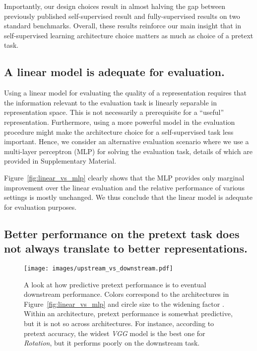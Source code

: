 \documentclass[10pt,twocolumn,letterpaper]{article}
\begin{document}
Importantly, our design choices result in almost halving the gap between previously published self-supervised result and fully-supervised results on two standard benchmarks.
Overall, these results reinforce our main insight that in self-supervised learning architecture choice matters as much as choice of a pretext task.
\subsection{A linear model is adequate for evaluation.}
\label{subsec:nonlinear}

Using a linear model for evaluating the quality of a representation requires that the information relevant to the evaluation task is linearly separable in representation space.
This is not necessarily a prerequisite for a ``useful'' representation.
Furthermore, using a more powerful model in the evaluation procedure might make the architecture choice for a self-supervised task less important.
Hence, we consider an alternative evaluation scenario where we use a multi-layer perceptron (MLP) for solving the evaluation task, details of which are provided in Supplementary Material.


Figure~\ref{fig:linear_vs_mlp} clearly shows that the MLP provides only marginal improvement over the linear evaluation and the relative performance of various settings is mostly unchanged.
We thus conclude that the linear model is adequate for evaluation purposes.

\subsection{Better performance on the pretext task does not always translate to better representations.}
\label{subsec:updown}

\begin{figure}[t]
  \begin{center}
    \texttt{[image: images/upstream\_vs\_downstream.pdf]}
  \end{center}
  \caption{
     A look at how predictive pretext performance is to eventual downstream performance.
     Colors correspond to the architectures in Figure~\ref{fig:linear_vs_mlp} and circle size to the widening factor .
     Within an architecture, pretext performance is somewhat predictive, but it is not so across architectures.
     For instance, according to pretext accuracy, the widest \emph{VGG} model is the best one for \emph{Rotation}, but it performs poorly on the downstream task.
  }\label{fig:updown}
\end{figure}
\end{document}
